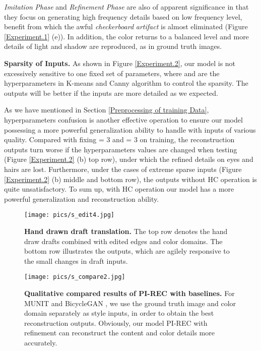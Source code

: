 \documentclass[10pt,twocolumn,letterpaper]{article} \usepackage{amsfonts,amssymb}
\begin{document}
 \emph{Imitation} \emph{Phase} and \emph{Refinement} \emph{Phase} are also of appa\-rent significance in that they focus on generating high frequency details based on low frequency level, benefit from which the awful \emph{checkerboard} \emph{artifact} is almost eliminated (Figure \ref{Experiment.1} (e)). In addition, the color returns to a balanced level and more details of light and shadow are reproduced, as in ground truth images.

{\bf Sparsity of Inputs. }
As shown in Figure \ref{Experiment.2}, our model is not excessively sensitive to one fixed set of parameters,  where  and  are the hyperparameters in K-means and Canny algorithm to control the sparsity. The outputs will be better if the inputs are more detailed as we expected.

As we have mentioned in Section \ref{Preprocessing of training Data}, hyperparameters confusion is another effective operation to ensure our model possessing a more powerful generalization ability to handle with inputs of various quality. Compared with fixing  = 3 and  = 3 on training, the reconstruction outputs turn worse if the hyperparameters values are changed when testing (Figure \ref{Experiment.2} (b) top row), under which the refined details on eyes and hairs are lost. Furthermore, under the cases of extreme sparse inputs (Figure \ref{Experiment.2} (b) middle and bottom row), the outputs without HC operation is quite unsatisfactory. To sum up, with HC operation our model has a more powerful generalization and reconstruction ability.



\begin{figure*}[t]
\centering



\texttt{[image: pics/s\_edit4.jpg]}

\caption{\textbf{Hand drawn draft translation.} The top row denotes the hand draw drafts combined with edited edges and color domains. The bottom row illustrates the outputs, which are agilely responsive to the small changes in draft inputs.}
\label{Experiment.3}
\end{figure*}
\begin{figure*}[!t]
\centering
\texttt{[image: pics/s\_compare2.jpg]}

\caption{\textbf{Qualitative compared results of PI-REC with baselines.} For MUNIT \cite{huang2018multimodal} and BicycleGAN \cite{zhu2017toward}, we use the ground truth image and color domain separately as style inputs, in order to obtain the best reconstruction outputs. Obviously, our model PI-REC with refinement can reconstruct the content and color details more accurately.}
\label{Experiment.4}
\end{figure*}
\end{document}
